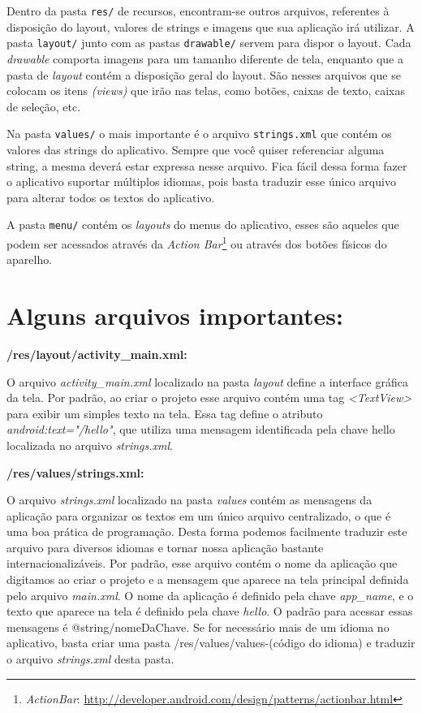 \documentclass[a4paper,12pt,brazil,oneside]{book}
\begin{document}
Dentro da pasta \texttt{res/} de recursos, encontram-se outros arquivos, referentes à disposição do layout, valores de strings e imagens que sua aplicação irá utilizar. A pasta \texttt{layout/} junto com as pastas \texttt{drawable/} servem para dispor o layout. Cada \textit{drawable} comporta imagens para um tamanho diferente de tela, enquanto que a pasta de \textit{layout} contém a disposição geral do layout. São nesses arquivos que se colocam os itens \emph{(views)} que irão nas telas, como botões, caixas de texto, caixas de seleção, etc.

Na pasta \texttt{values/} o mais importante é o arquivo \texttt{strings.xml} que contém os valores das strings do aplicativo. Sempre que você quiser referenciar alguma string, a mesma deverá estar expressa nesse arquivo. Fica fácil dessa forma fazer o aplicativo suportar múltiplos idiomas, pois basta traduzir esse único arquivo para alterar todos os textos do aplicativo.

A pasta \texttt{menu/} contém os \emph{layouts} do menus do aplicativo, esses são aqueles que podem ser acessados através da \emph{Action Bar}\footnote{\emph{ActionBar}: \href{http://developer.android.com/design/patterns/actionbar.html}{http://developer.android.com/design/patterns/actionbar.html}} ou através dos botões físicos do aparelho.

\section{Alguns arquivos importantes:}

\textbf{/res/layout/activity\_main.xml:}

O arquivo \emph{activity\_main.xml} localizado na pasta \emph{layout} define a interface gráfica da tela. Por padrão, ao criar o projeto esse arquivo contém uma tag \emph{<TextView>} para exibir um simples texto na tela. Essa tag define o atributo \emph{android:text="\@string/hello"}, que utiliza uma mensagem identificada pela chave hello localizada no arquivo \emph{strings.xml}.

\textbf{/res/values/strings.xml:}

O arquivo \emph{strings.xml} localizado na pasta \emph{values} contém as mensagens da aplicação para organizar os textos em um único arquivo centralizado, o que é uma boa prática de programação. Desta forma podemos facilmente traduzir este arquivo para diversos idiomas e tornar nossa aplicação bastante internacionalizáveis.
Por padrão, esse arquivo contém o nome da aplicação que digitamos ao criar o projeto e a mensagem que aparece na tela principal definida pelo arquivo \emph{main.xml}.
O nome da aplicação é definido pela chave \emph{app\_name}, e o texto que aparece na tela é definido pela chave \emph{hello}.  O padrão para acessar essas mensagens é @string/nomeDaChave.
Se for necessário mais de um idioma no aplicativo, basta criar uma pasta /res/values/values-(código do idioma) e traduzir o arquivo \emph{strings.xml} desta pasta.
\end{document}
